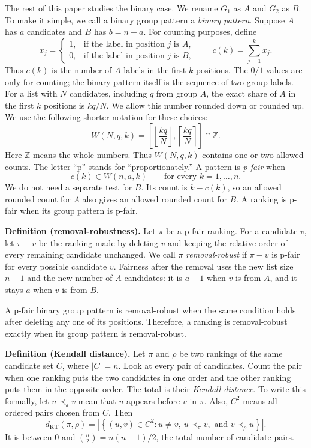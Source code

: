 \documentclass[11pt]{article}
\newcommand{\floor}[1]{\left\lfloor #1\right\rfloor}
\newcommand{\ceil}[1]{\left\lceil #1\right\rceil}
\newcommand{\KT}{d_{\mathrm{KT}}}
\begin{document}
The rest of this paper studies the binary case.  We rename $G_1$ as $A$ and
$G_2$ as $B$.
To make it simple, we call a binary group pattern a \emph{binary
pattern}.  Suppose $A$ has $a$ candidates and $B$ has $b=n-a$.  For
counting purposes, define
\[
 x_j=
 \begin{cases}
  1,&\text{if the label in position $j$ is $A$},\\
  0,&\text{if the label in position $j$ is $B$},
 \end{cases}
 \qquad
 c(k)=\sum_{j=1}^{k}x_j.
\]
Thus $c(k)$ is the number of $A$ labels in the first $k$ positions.  The
$0/1$ values are only for counting; the binary pattern itself is the
sequence of two group labels.
For a list with $N$ candidates, including $q$ from group $A$, the exact share
of $A$ in the first $k$ positions is $kq/N$.  We allow this number rounded
down or rounded up.  We use the following shorter notation for these choices:
\[
  W(N,q,k)=
  \left[\floor{\frac{kq}{N}},\ceil{\frac{kq}{N}}\right]\cap\mathbb Z.
\]
Here $\mathbb Z$ means the whole numbers.  Thus $W(N,q,k)$ contains one or two
allowed counts.  The letter ``p'' stands for ``proportionately.''  A pattern
is \emph{p-fair} when
\[
  c(k)\in W(n,a,k) \qquad\text{for every }k=1,\ldots,n.
\]
We do not need a separate test for $B$.  Its count is $k-c(k)$, so an allowed
rounded count for $A$ also gives an allowed rounded count for $B$.  A ranking
is p-fair when its group pattern is p-fair.

\medskip
\noindent\textbf{Definition (removal-robustness).}
Let $\pi$ be a p-fair ranking.  For a candidate $v$, let $\pi-v$ be the
ranking made by deleting $v$ and keeping the relative order of every
remaining candidate unchanged.  We call $\pi$ \emph{removal-robust} if
$\pi-v$ is p-fair for every possible candidate $v$.  Fairness after the
removal uses the new list size $n-1$ and the new number of $A$ candidates:
it is $a-1$ when $v$ is from $A$, and it stays $a$ when $v$ is from $B$.

A p-fair binary group pattern is removal-robust when the same condition holds
after deleting any one of its positions.  Therefore, a ranking is
removal-robust exactly when its group pattern is removal-robust.
\medskip

\noindent\textbf{Definition (Kendall distance).}
Let $\pi$ and $\rho$ be two rankings of the same candidate set $C$, where
$|C|=n$.  Look at every pair of candidates.  Count the pair when one ranking
puts the two candidates in one order and the other ranking puts them in the
opposite order.  The total is their \emph{Kendall distance}.  To write this
formally, let $u\prec_\pi v$ mean that $u$ appears before $v$ in $\pi$.
Also, $C^2$ means all ordered pairs chosen from $C$.  Then
\[
 \KT(\pi,\rho)
 =\left|\left\{(u,v)\in C^2:
 u\ne v,\ u\prec_\pi v,\text{ and }v\prec_\rho u\right\}\right|.
\]
It is between 0 and
$\binom{n}{2}=n(n-1)/2$, the total number of candidate pairs.
\end{document}
